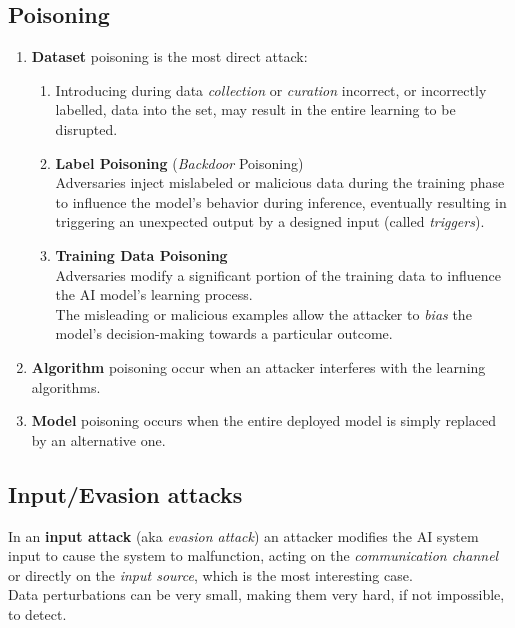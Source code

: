 \subsection{Poisoning}
\begin{enumerate}
   \item \textbf{Dataset} poisoning is the most direct attack:
   \begin{enumerate}
      \item[] Introducing during data \textit{collection} or \textit{curation} incorrect, or incorrectly labelled, data into the set, may result in the entire learning to be disrupted.
      \item \textbf{Label Poisoning} (\textit{Backdoor} Poisoning)\\
      Adversaries inject mislabeled or malicious
      data during the training phase to influence the model's behavior during inference,
      eventually resulting in triggering an unexpected output by a designed input (called \textit{triggers}).
      \item \textbf{Training Data Poisoning}\\
      Adversaries modify a significant portion of the training data to influence the AI model's learning process.\\
      The misleading or malicious examples
      allow the attacker to \textit{bias} the model's decision-making towards a particular outcome.
   \end{enumerate}
   \item \textbf{Algorithm} poisoning occur when an attacker interferes with the learning algorithms.
   \item \textbf{Model} poisoning occurs when the entire deployed model is simply replaced
   by an alternative one.
\end{enumerate}

\subsection{Input/Evasion attacks}
In an \textbf{input attack} (aka \textit{evasion attack}) an attacker modifies the AI system input to cause the system to malfunction,
acting on the \textit{communication channel} or directly on the \textit{input source}, which is the most interesting case.\\
Data perturbations can be very small, making them very hard, if
not impossible, to detect. 

